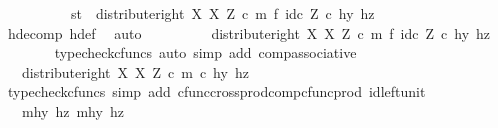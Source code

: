 \begin{isabellebody}
\ \ \isamarkupfalse%
\ {\isacharminus}{\kern0pt}\isanewline
\ \ \ \ \isamarkupfalse%
\ {\isachardoublequoteopen}{\isasymlangle}s{\isacharcomma}{\kern0pt}t{\isasymrangle}\ {\isacharequal}{\kern0pt}\ {\isacharparenleft}{\kern0pt}distribute{\isacharunderscore}{\kern0pt}right\ X\ X\ Z\ {\isasymcirc}\isactrlsub c\ m\ {\isasymtimes}\isactrlsub f\ id\isactrlsub c\ Z{\isacharparenright}{\kern0pt}\ {\isasymcirc}\isactrlsub c\ {\isasymlangle}hy{\isacharcomma}{\kern0pt}\ hz{\isasymrangle}{\isachardoublequoteclose}\isanewline
\ \ \ \ \ \ \isamarkupfalse%
\ h{\isacharunderscore}{\kern0pt}decomp\ h{\isacharunderscore}{\kern0pt}def\ \isamarkupfalse%
\ auto\isanewline
\ \ \ \ \isamarkupfalse%
\ \isamarkupfalse%
\ {\isachardoublequoteopen}{\isachardot}{\kern0pt}{\isachardot}{\kern0pt}{\isachardot}{\kern0pt}\ {\isacharequal}{\kern0pt}\ distribute{\isacharunderscore}{\kern0pt}right\ X\ X\ Z\ {\isasymcirc}\isactrlsub c\ {\isacharparenleft}{\kern0pt}m\ {\isasymtimes}\isactrlsub f\ id\isactrlsub c\ Z{\isacharparenright}{\kern0pt}\ {\isasymcirc}\isactrlsub c\ {\isasymlangle}hy{\isacharcomma}{\kern0pt}\ hz{\isasymrangle}{\isachardoublequoteclose}\isanewline
\ \ \ \ \ \ \isamarkupfalse%
\ {\isacharparenleft}{\kern0pt}typecheck{\isacharunderscore}{\kern0pt}cfuncs{\isacharcomma}{\kern0pt}\ auto\ simp\ add{\isacharcolon}{\kern0pt}\ comp{\isacharunderscore}{\kern0pt}associative{}{\isacharparenright}{\kern0pt}\isanewline
\ \ \ \ \isamarkupfalse%
\ \isamarkupfalse%
\ {\isachardoublequoteopen}{\isachardot}{\kern0pt}{\isachardot}{\kern0pt}{\isachardot}{\kern0pt}\ {\isacharequal}{\kern0pt}\ distribute{\isacharunderscore}{\kern0pt}right\ X\ X\ Z\ {\isasymcirc}\isactrlsub c\ {\isasymlangle}m\ {\isasymcirc}\isactrlsub c\ hy{\isacharcomma}{\kern0pt}\ hz{\isasymrangle}{\isachardoublequoteclose}\isanewline
\ \ \ \ \ \ \isamarkupfalse%
\ {\isacharparenleft}{\kern0pt}typecheck{\isacharunderscore}{\kern0pt}cfuncs{\isacharcomma}{\kern0pt}\ simp\ add{\isacharcolon}{\kern0pt}\ cfunc{\isacharunderscore}{\kern0pt}cross{\isacharunderscore}{\kern0pt}prod{\isacharunderscore}{\kern0pt}comp{\isacharunderscore}{\kern0pt}cfunc{\isacharunderscore}{\kern0pt}prod\ id{\isacharunderscore}{\kern0pt}left{\isacharunderscore}{\kern0pt}unit{}{\isacharparenright}{\kern0pt}\isanewline
\ \ \ \ \isamarkupfalse%
\ \isamarkupfalse%
\ {\isachardoublequoteopen}{\isachardot}{\kern0pt}{\isachardot}{\kern0pt}{\isachardot}{\kern0pt}\ {\isacharequal}{\kern0pt}\ {\isasymlangle}{\isasymlangle}mhy{}{\isacharcomma}{\kern0pt}\ hz{\isasymrangle}{\isacharcomma}{\kern0pt}\ {\isasymlangle}mhy{}{\isacharcomma}{\kern0pt}\ hz{\isasymrangle}{\isasymrangle}{\isachardoublequoteclose}\isanewline

\end{isabellebody}
